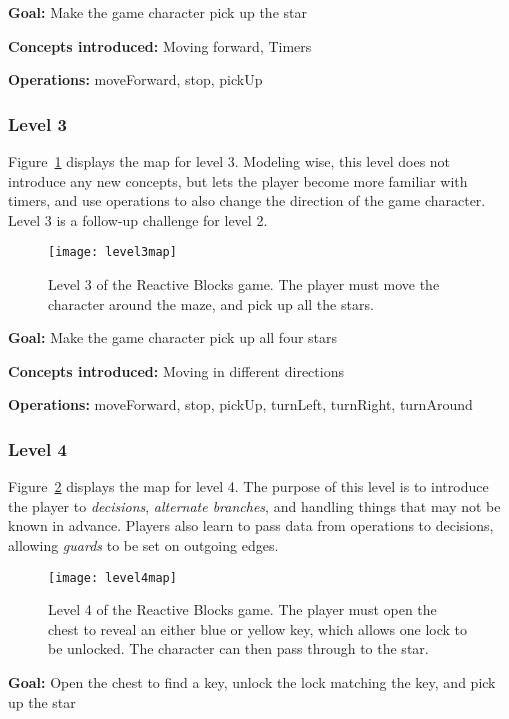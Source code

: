 \noindent
\textbf{Goal:} Make the game character pick up the star

\noindent
\textbf{Concepts introduced:} Moving forward, Timers

\noindent
\textbf{Operations:} moveForward, stop, pickUp

\subsubsection{Level 3}
Figure~\ref{fig:level3map} displays the map for level 3. Modeling wise, this level does not introduce any new concepts, but lets the player become more familiar with timers, and use operations to also change the direction of the game character. Level 3 is a follow-up challenge for level 2.

\begin{figure}[htp]
	\centering
	\texttt{[image: level3map]}
	\caption[Level 3 of the Reactive Blocks game]{Level 3 of the Reactive Blocks game. The player must move the character around the maze, and pick up all the stars.}
	\label{fig:level3map}
\end{figure}

\noindent
\textbf{Goal:} Make the game character pick up all four stars

\noindent
\textbf{Concepts introduced:} Moving in different directions

\noindent
\textbf{Operations:} moveForward, stop, pickUp, turnLeft, turnRight, turnAround

\subsubsection{Level 4}
Figure~\ref{fig:level4map} displays the map for level 4. The purpose of this level is to introduce the player to \emph{decisions}, \emph{alternate branches}, and handling things that may not be known in advance. Players also learn to pass data from operations to decisions, allowing \emph{guards} to be set on outgoing edges.

\begin{figure}[htp]
	\centering
	\texttt{[image: level4map]}
	\caption[Level 4 of the Reactive Blocks game]{Level 4 of the Reactive Blocks game. The player must open the chest to reveal an either blue or yellow key, which allows one lock to be unlocked. The character can then pass through to the star.}
	\label{fig:level4map}
\end{figure}

\noindent
\textbf{Goal:} Open the chest to find a key, unlock the lock matching the key, and pick up the star


